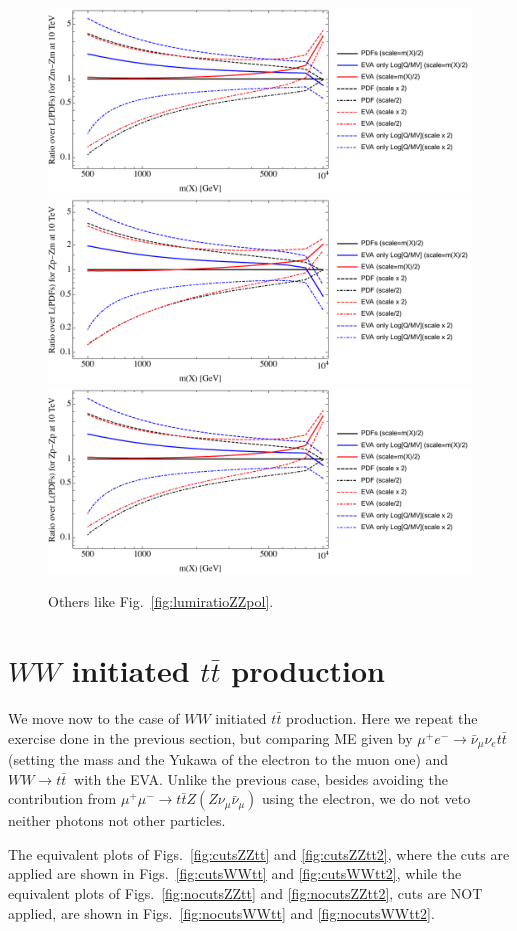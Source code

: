 \documentclass[a4paper,11pt]{article}
\begin{document}
\begin{figure}[!t]
\includegraphics[width=0.46\linewidth]{Notebooks/PlotLumi/10TeV/ratios/Zm-Zm.pdf}
\includegraphics[width=0.46\linewidth]{Notebooks/PlotLumi/10TeV/ratios/Zp-Zm.pdf}
\includegraphics[width=0.46\linewidth]{Notebooks/PlotLumi/10TeV/ratios/Zp-Zp.pdf}
\caption{Others like Fig.~\ref{fig:lumiratioZZpol}. \label{fig:lumiratioZZpol2}}
\end{figure}

\clearpage

\section{$WW$ initiated $t \bar t$ production}

We move now to the case of $WW$ initiated $t \bar t$ production. Here we repeat the exercise done in the previous section, but comparing ME given by $\mu^+e^-\to\bar \nu_\mu \nu_e t \bar t$ (setting the mass and the Yukawa of the electron to the muon one) and $WW\to t \bar t~$ with the EVA. Unlike the previous case, besides avoiding the contribution from $\mu^+\mu^-\to t \bar t Z (Z \nu_\mu \bar \nu_\mu )$ using the electron, we do not veto neither photons not other particles.

The equivalent plots of Figs.~\ref{fig:cutsZZtt} and \ref{fig:cutsZZtt2}, where the cuts are applied  are shown in Figs.~\ref{fig:cutsWWtt} and \ref{fig:cutsWWtt2}, while the  equivalent plots of Figs.~\ref{fig:nocutsZZtt} and \ref{fig:nocutsZZtt2}, cuts are NOT applied,  are shown in Figs.~\ref{fig:nocutsWWtt} and \ref{fig:nocutsWWtt2}. 
\end{document}
